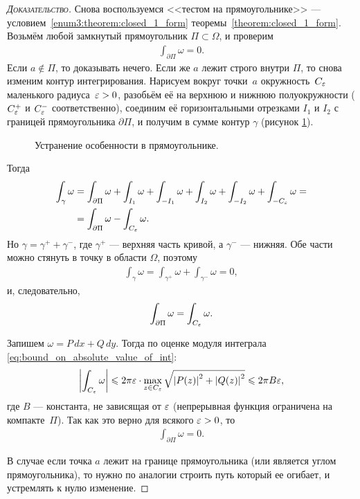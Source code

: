 \documentclass[../complex-analysis.tex]{subfiles}
\begin{document}
\begin{proof}[\normalfont\textsc{Доказательство}]
 Снова воспользуемся <<тестом на прямоугольнике>> --- условием~\ref{enum3:theorem:closed_1_form} теоремы~\ref{theorem:closed_1_form}. Возьмём любой замкнутый прямоугольник $\Pi \subset \Omega$, и проверим
 \begin{align*}
  \int_{\partial\Pi} \omega=0.
 \end{align*} Если $a \notin \Pi$, то доказывать нечего. Если же $ a $ лежит строго внутри $ \Pi $, то снова изменим контур интегрирования. Нарисуем вокруг точки~$ a $ окружность~$ C_\varepsilon $ маленького радиуса~$ \varepsilon > 0 $, разобьём её на верхнюю и нижнюю полуокружности ($ C_\varepsilon^{+} $ и $ C_\varepsilon^{-} $ соответственно), соединим её горизонтальными отрезками $ I_1 $ и $ I_2 $ с границей прямоугольника $ \partial\Pi $, и получим в сумме контур $ \gamma $ (рисунок \ref{fig:special_point_in_rectangle}).

 \begin{figure}[ht]
  \centering
  \caption{Устранение особенности в прямоугольнике.}
  \label{fig:special_point_in_rectangle}
 \end{figure}

 Тогда
 \begin{align*}
  \int_{\gamma} \omega &= \int_{\partial\Pi} \omega + \int_{I_1} \omega + \int_{-I_1} \omega + \int_{I_2} \omega + \int_{-I_2} \omega + \int_{-C_\varepsilon} \omega = \\
  &= \int_{\partial\Pi} \omega - \int_{C_\varepsilon}  \omega.
 \end{align*} Но $ \gamma = \gamma^{+} + \gamma^{-} $, где $ \gamma^{+} $ --- верхняя часть кривой, а $ \gamma^{-} $ --- нижняя. Обе части можно стянуть в точку в области $ \Omega $, поэтому
 \begin{align*}
  \int_{\gamma} \omega = \int_{\gamma^{+}} \omega + \int_{\gamma^{-}}  \omega = 0,
 \end{align*} и, следовательно,
 \begin{align*}
  \int_{\partial\Pi} \omega = \int_{C_\varepsilon}   \omega.
 \end{align*}

 Запишем $ \omega = P\,dx + Q\,dy $. Тогда по оценке модуля интеграла \eqref{eq:bound_on_absolute_value_of_int}:
 \begin{align*}
  \left| \int_{C_\varepsilon} \omega  \right| \leqslant 2\pi\varepsilon \cdot \max_{z \in C_\varepsilon} \sqrt{ \left| P(z) \right|^{2} + \left| Q(z) \right|^{2} } \leqslant 2\pi B \varepsilon,
 \end{align*} где $ B $ --- константа, не зависящая от $ \varepsilon $ (непрерывная функция ограничена на компакте~$ \Pi $). Так как это верно для всякого $ \varepsilon > 0 $, то
 \begin{align*}
  \int_{\partial\Pi}   \omega = 0.
 \end{align*} 

 В случае если точка $a$ лежит на границе прямоугольника (или является углом прямоугольника), то нужно по аналогии строить путь который ее огибает, и устремлять к нулю изменение.

\end{proof}
\end{document}
